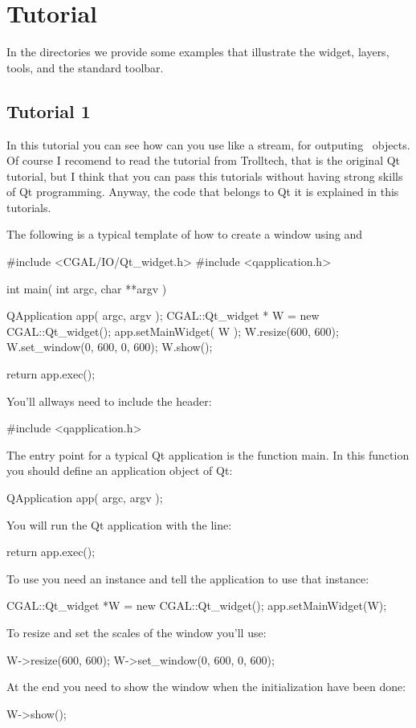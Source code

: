 \section{Tutorial}

In the directories  we provide some examples that illustrate the widget, layers, tools, and the standard toolbar.

\subsection*{Tutorial 1}

In this tutorial you can see how can you use  like
a stream, for outputing \cgal\ objects.  Of course I recomend to read
the tutorial from Trolltech, that is the original Qt tutorial, but I
think that you can pass this tutorials without having strong skills of Qt
programming. Anyway, the code that belongs to Qt it is explained in
this tutorials.

The following is a typical template of how to create a window using
 and 
\begin{ccExampleCode}
#include <CGAL/IO/Qt_widget.h>
#include <qapplication.h>

int main( int argc, char **argv )
{
    QApplication app( argc, argv );
    CGAL::Qt_widget * W = new CGAL::Qt_widget();
    app.setMainWidget( W );
    W.resize(600, 600);
    W.set_window(0, 600, 0, 600);
    W.show();

    return app.exec();
}
\end{ccExampleCode}
You'll allways need to include the header:
\begin{ccExampleCode}
#include <qapplication.h>
\end{ccExampleCode}

The entry point for a typical Qt application is the function main. In
this function you should define an application object of Qt:
\begin{ccExampleCode}
QApplication app( argc, argv );
\end{ccExampleCode}
You will run the Qt application with the line:
\begin{ccExampleCode}
return app.exec();
\end{ccExampleCode}
To use  you need an instance and tell the
application to use that instance:
\begin{ccExampleCode}
CGAL::Qt_widget *W = new CGAL::Qt_widget();
app.setMainWidget(W);
\end{ccExampleCode}
To resize and set the scales of the window you'll use:
\begin{ccExampleCode}
W->resize(600, 600);
W->set_window(0, 600, 0, 600);
\end{ccExampleCode}
At the end you need to show the window when the initialization have been done:
\begin{ccExampleCode}
W->show();
\end{ccExampleCode}


